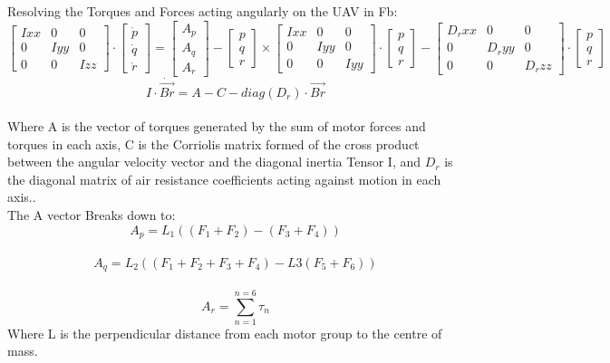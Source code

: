 \documentclass[12pt,a4paper,twoside]{report}
\begin{document}
					Resolving the Torques and Forces acting angularly on the UAV in Fb:
					\\
					$$ 
					\begin{bmatrix}
						Ixx & 0 & 0 \\
						0 & Iyy & 0 \\
						0 & 0 & Izz
					\end{bmatrix}
					\cdot 
					\begin{bmatrix}
						\dot{p} \\
						\dot{q} \\
						\dot{r}
					\end{bmatrix}
					=
					\begin{bmatrix}
						A_p \\
						A_q \\
						A_r
					\end{bmatrix}
					-
					\begin{bmatrix}
						p \\
						q \\
						r 
					\end{bmatrix}
					\times
					\begin{bmatrix}
						Ixx & 0 & 0 \\
						0 & Iyy & 0 \\
						0 & 0 & Iyy
					\end{bmatrix}
					\cdot
					\begin{bmatrix}
						p \\
						q \\
						r 
					\end{bmatrix}
					-
					\begin{bmatrix}
						D_rxx & 0 & 0 \\
						0 & D_ryy & 0 \\
						0 & 0 & D_rzz
					\end{bmatrix}
					\cdot
					\begin{bmatrix}
						p \\
						q \\
						r
					\end{bmatrix}
					$$ 
					\[ I \cdot \dot{\vec{Br}} = A - C -  diag(D_r) \cdot \vec{Br}  \]
					\\
					Where A is the vector of torques generated by the sum of motor forces and torques in each axis, C is the Corriolis matrix formed of the cross product between the angular velocity vector and the diagonal inertia Tensor I, and \(D_r\) is the diagonal matrix of air resistance coefficients acting against motion in each axis.. 
					\\
					The A vector Breaks down to:
					\\
					\[ A_p = L_1 ((F_1+F_2) - (F_3+F_4)) \]
					\\
					\[ A_q = L_2 ((F_1+F_2+F_3+F_4) - L3 (F_5+F_6)) \]
					\\
					\[ A_r = \sum_{n = 1}^{n = 6}\tau_n \]
					Where L is the perpendicular distance from each motor group to the centre of mass.
					
\end{document}
